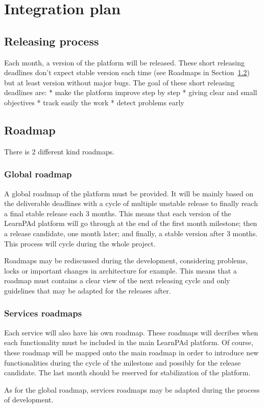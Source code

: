 \chapter{Integration plan}
\label{ch:integration-plan}

\section{Releasing process}
\label{sec:releasing-process}

Each month, a version of the platform will be released.  These short releasing deadlines don't expect stable version each time (see Roadmaps in Section~\ref{sec:roadmap}) but at least version without major bugs.  The goal of these short releasing deadlines  are:
* make the platform improve step by step
* giving clear and small objectives
* track easily the work
* detect problems early

\section{Roadmap}
\label{sec:roadmap}

There is 2 different kind roadmaps.
\subsection{Global roadmap}
\label{sec:global-roadmap}

A global roadmap of the platform must be provided.  It will be mainly based on the deliverable deadlines with a cycle of multiple unstable release to finally reach a final stable release each 3 months.  This means that each version of the LearnPAd platform will go through at the end of the first month milestone; then a release candidate, one month later; and finally, a stable version after 3 months.  This process will cycle during the whole project.

Roadmaps may be rediscussed during the development, considering problems, locks or important changes in architecture for example.  This means that a roadmap must contains a clear view of the next releasing cycle and only guidelines that may be adapted for the releases after.

\subsection{Services roadmaps}
\label{sec:services-roadmaps}

Each service will also have his own roadmap.  These roadmaps will decribes when each functionality must be included in the main LearnPAd platform.  Of course, these roadmap will be mapped onto the main roadmap in order to introduce new functionalities during the cycle of the milestone and possibly for the release candidate.  The last month should be reserved for stabilization of the platform.

As for the global roadmap, services roadmaps may be adapted during the process of development.
